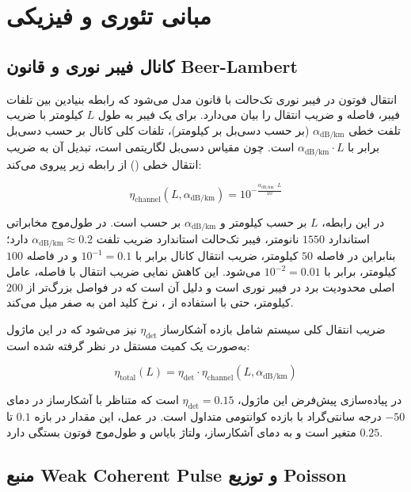 \section{مبانی تئوری و فیزیکی}

\subsection{کانال فیبر نوری و قانون Beer-Lambert}

انتقال فوتون در فیبر نوری تک‌حالت با قانون  مدل می‌شود که رابطه بنیادین بین تلفات فیبر، فاصله و ضریب انتقال را بیان می‌دارد. برای یک فیبر به طول $L$ کیلومتر با ضریب تلفت خطی $\alpha_{\text{dB/km}}$ (بر حسب دسی‌بل بر کیلومتر)، تلفات کلی کانال بر حسب دسی‌بل برابر با $\alpha_{\text{dB/km}} \cdot L$ است. چون مقیاس دسی‌بل لگاریتمی است، تبدیل آن به ضریب انتقال خطی () از رابطه زیر پیروی می‌کند:

\begin{equation}
	\eta_{\text{channel}}(L, \alpha_{\text{dB/km}}) = 10^{-\frac{\alpha_{\text{dB/km}} \cdot L}{10}}
\end{equation}

در این رابطه، $L$ بر حسب کیلومتر و $\alpha_{\text{dB/km}}$ بر حسب  است. در طول‌موج مخابراتی استاندارد $1550$ نانومتر، فیبر تک‌حالت استاندارد ضریب تلفت $\alpha_{\text{dB/km}} \approx 0.2$ دارد؛ بنابراین در فاصله $50$ کیلومتر، ضریب انتقال کانال برابر با $10^{-1} = 0.1$ و در فاصله $100$ کیلومتر، برابر با $10^{-2} = 0.01$ می‌شود. این کاهش نمایی ضریب انتقال با فاصله، عامل اصلی محدودیت برد  در فیبر نوری است و دلیل آن است که در فواصل بزرگ‌تر از $200$ کیلومتر، حتی با استفاده از ، نرخ کلید امن به صفر میل می‌کند.

ضریب انتقال کلی سیستم شامل بازده آشکارساز $\eta_{\text{det}}$ نیز می‌شود که در این ماژول به‌صورت یک کمیت مستقل در نظر گرفته شده است:

\begin{equation}
	\eta_{\text{total}}(L) = \eta_{\text{det}} \cdot \eta_{\text{channel}}(L, \alpha_{\text{dB/km}})
\end{equation}

در پیاده‌سازی پیش‌فرض این ماژول، $\eta_{\text{det}} = 0.15$ است که متناظر با آشکارساز  در دمای $-50$ درجه سانتی‌گراد با بازده کوانتومی متداول است. در عمل، این مقدار در بازه $0.1$ تا $0.25$ متغیر است و به دمای آشکارساز، ولتاژ بایاس و طول‌موج فوتون بستگی دارد.

\subsection{منبع Weak Coherent Pulse و توزیع Poisson}


